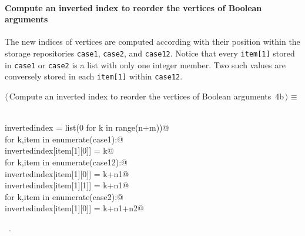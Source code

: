 \documentclass[11pt,oneside]{article}	%
\begin{document}
\paragraph{Compute an inverted index to reorder the vertices of Boolean arguments}
The new indices of vertices are computed according with their position within the storage repositories \texttt{case1}, \texttt{case2}, and \texttt{case12}. Notice that every \texttt{item[1]} stored in \texttt{case1} or \texttt{case2} is a list with only one integer member. Two such values are conversely stored in each \texttt{item[1]} within \texttt{case12}.
\begin{flushleft} \small \label{scrap6}
\protect{}$\langle\,$Compute an inverted index to reorder the vertices of Boolean arguments\nobreak\ {\footnotesize 4b}$\,\rangle\equiv$
\vspace{-1ex}
\begin{list}{}{} \item
\mbox{}\verb@@\\
\mbox{}\verb@   invertedindex = list(0 for k in range(n+m))@\\
\mbox{}\verb@   for k,item in enumerate(case1):@\\
\mbox{}\verb@      invertedindex[item[1][0]] = k@\\
\mbox{}\verb@   for k,item in enumerate(case12):@\\
\mbox{}\verb@      invertedindex[item[1][0]] = k+n1@\\
\mbox{}\verb@      invertedindex[item[1][1]] = k+n1@\\
\mbox{}\verb@   for k,item in enumerate(case2):@\\
\mbox{}\verb@      invertedindex[item[1][0]] = k+n1+n2@\\
\mbox{}\verb@@{\NWsep}
\end{list}
\vspace{-1ex}
\footnotesize\addtolength{\baselineskip}{-1ex}
\begin{list}{}{\setlength{\itemsep}{-\parsep}\setlength{\itemindent}{-\leftmargin}}
\item \NWtxtMacroRefIn\ .
\end{list}
\end{flushleft}

\end{document}
